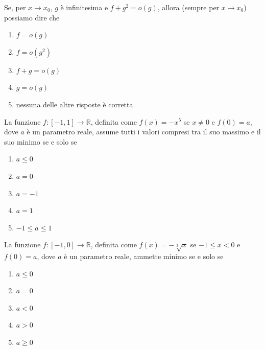 \begin{quiz}
Se, per $x\to x_0$, $g$ \`e infinitesima e $f+g^2=o(g)$, allora (sempre per $x\to x_0$) possiamo dire che
\begin{enumerate}
\item $f=o(g)$
\item $f=o(g^2)$
\item $f+g=o(g)$
\item $g=o(g)$
\item nessuna delle altre risposte \`e corretta
\end{enumerate}
\end{quiz}

\begin{quiz}
La funzione $f:[-1,1]\to\mathbb R$, definita come $f(x)=-x^5$ se $x\neq0$ e $f(0)=a$, dove $a$ \`e un parametro reale, assume tutti i valori compresi tra il suo massimo e il suo minimo se e solo se
\begin{enumerate}
\item $a\le0$
\item $a=0$
\item $a=-1$
\item $a=1$
\item $-1\le a\le1$
\end{enumerate}
\end{quiz}

\begin{quiz}
La funzione $f:[-1,0]\to\mathbb R$, definita come $f(x)=-\sqrt[3]{x}$ se $-1\le x<0$ e $f(0)=a$, dove $a$ \`e un parametro reale, ammette minimo se e solo se
\begin{enumerate}
\item $a\le0$
\item $a=0$
\item $a<0$
\item $a>0$
\item $a\ge0$
\end{enumerate}
\end{quiz}

